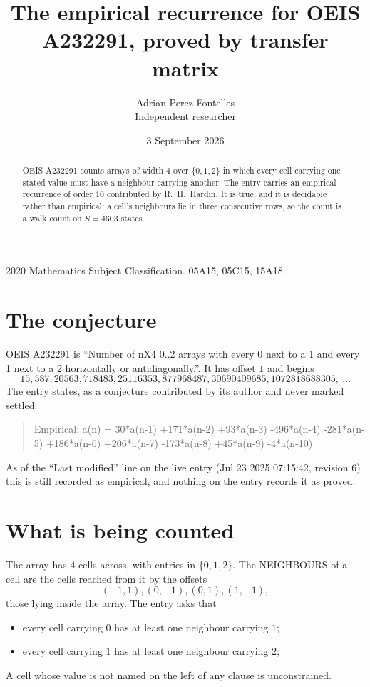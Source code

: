 \documentclass[11pt,a4paper]{article}
\title{The empirical recurrence for OEIS A232291, proved by transfer matrix}
\author{Adrian Perez Fontelles\\ \small Independent researcher}
\date{3 September 2026}
\theoremstyle{plain}
\theoremstyle{definition}
\begin{document}
\maketitle

\begin{abstract}
OEIS A232291 counts arrays of width $4$ over $\{0,1,2\}$ in which every cell carrying one stated
value must have a neighbour carrying another. The entry carries an empirical recurrence of
order $10$ contributed by R.~H.~Hardin. It is true, and it is decidable rather than
empirical: a cell's neighbours lie in three consecutive rows, so the count is a walk count on
$S=4603$ states.
\end{abstract}

\noindent\small 2020 Mathematics Subject Classification. 05A15, 05C15, 15A18.\normalsize

\section{The conjecture}

OEIS A232291 is ``Number of nX4 0..2 arrays with every 0 next to a 1 and every 1 next to a 2 horizontally or antidiagonally.''. It has offset $1$ and begins
\[
15, 587, 20563, 718483, 25116353, 877968487, 30690409685, 1072818688305,\ \dots
\]
The entry states, as a conjecture contributed by its author and never marked settled:
\begin{quote}
Empirical: a(n) = 30*a(n-1) +171*a(n-2) +93*a(n-3) -496*a(n-4) -281*a(n-5) +186*a(n-6) +206*a(n-7) -173*a(n-8) +45*a(n-9) -4*a(n-10)
\end{quote}
As of the ``Last modified'' line on the live entry (Jul 23 2025 07:15:42, revision 6) this is still
recorded as empirical, and nothing on the entry records it as proved.

\section{What is being counted}

The array has $4$ cells across, with entries in $\{0,1,2\}$. The NEIGHBOURS of a cell are the
cells reached from it by the offsets
\[
(-1,1), (0,-1), (0,1), (1,-1),
\]
those lying inside the array. The entry asks that
\begin{itemize}
\item every cell carrying $0$ has at least one neighbour carrying $1$;
\item every cell carrying $1$ has at least one neighbour carrying $2$;

\end{itemize}
A cell whose value is not named on the left of any clause is unconstrained.
\end{document}
